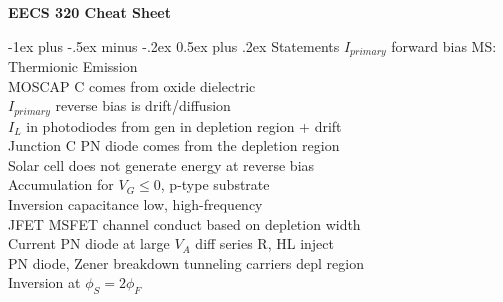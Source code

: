 \documentclass[11pt,landscape]{article}
\makeatletter
\renewcommand{\section}{\@startsection{section}{1}{0mm}%
                                {-1ex plus -.5ex minus -.2ex}%
                                {0.5ex plus .2ex}%
                                {\normalfont\large\bfseries}}
\makeatother
\begin{document}
\raggedright
\footnotesize
\begin{multicols}{3}


\setlength{\premulticols}{1pt}
\setlength{\postmulticols}{1pt}
\setlength{\multicolsep}{1pt}
\setlength{\columnsep}{2pt}

\begin{center}
     \Large{\textbf{EECS 320 Cheat Sheet}} \\
\end{center}

\section{Statements}
$I_{primary}$ forward bias MS: Thermionic Emission \\
MOSCAP C comes from oxide dielectric \\
$I_{primary}$ reverse bias is drift/diffusion \\
$I_L$ in photodiodes from gen in depletion region + drift \\
Junction C PN diode comes from the depletion region \\
Solar cell does not generate energy at reverse bias \\
Accumulation for $V_G \leq 0$, p-type substrate \\
Inversion capacitance low, high-frequency \\
JFET MSFET channel conduct based on depletion width \\
Current PN diode at large $V_A$ diff series R, HL inject \\
PN diode, Zener breakdown tunneling carriers depl region\\
Inversion at $\phi_S = 2\phi_{F}$ \\



\end{multicols}
\end{document}
